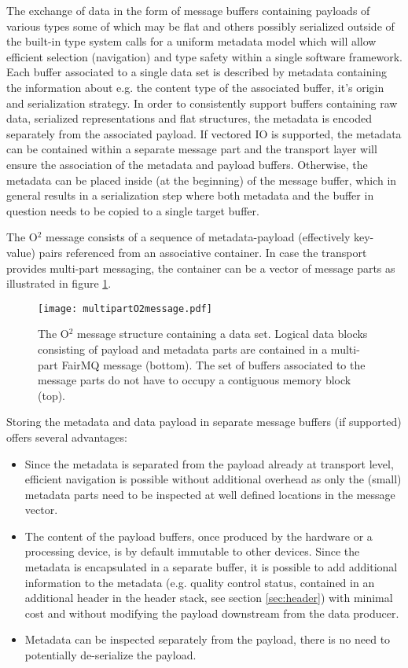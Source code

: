 \documentclass[a4paper,twoside]{article}
\def\O2{O$^2$}
\begin{document}
The exchange of data in the form of message buffers containing payloads of various types some of which may be flat and others possibly serialized outside of the built-in type system calls for a uniform metadata model which will allow efficient selection (navigation) and type safety within a single software framework.
Each buffer associated to a single data set is described by metadata containing the information about e.g. the content type of the associated buffer, it's origin and serialization strategy. In order to consistently support buffers containing raw data, serialized representations and flat structures, the metadata is encoded separately from the associated payload.
If vectored IO is supported, the metadata can be contained within a separate message part and the transport layer will ensure the association of the metadata and payload buffers. Otherwise, the metadata can be placed inside (at the beginning) of the message buffer, which in general results in a serialization step where both metadata and the buffer in question needs to be copied to a single target buffer.

The \O2 message consists of a sequence of metadata-payload (effectively key-value) pairs referenced from an associative container. In case the transport provides multi-part messaging, the container can be a vector of message parts as illustrated in figure \ref{fig:o2message}.

\begin{figure}[h]
  \centering
  \texttt{[image: multipartO2message.pdf]}
  \caption{The \O2 message structure containing a data set. Logical data blocks consisting of payload and metadata parts are contained in a multi-part FairMQ message (bottom). The set of buffers associated to the message parts do not have to occupy a contiguous memory block (top).}
  \label{fig:o2message} 
\end{figure}

Storing the metadata and data payload in separate message buffers (if supported) offers several advantages:
\begin{itemize}
  \item Since the metadata is separated from the payload already at transport level, efficient navigation is possible without additional overhead as only the (small) metadata parts need to be inspected at well defined locations in the message vector.
  \item The content of the payload buffers, once produced by the hardware or a processing device, is by default immutable to other devices. Since the metadata is encapsulated in a separate buffer, it is possible to add additional information to the metadata (e.g. quality control status, contained in an additional header in the header stack, see section \ref{sec:header}) with minimal cost and without modifying the payload downstream from the data producer.
  \item Metadata can be inspected separately from the payload, there is no need to potentially de-serialize the payload.
\end{itemize}
\end{document}
